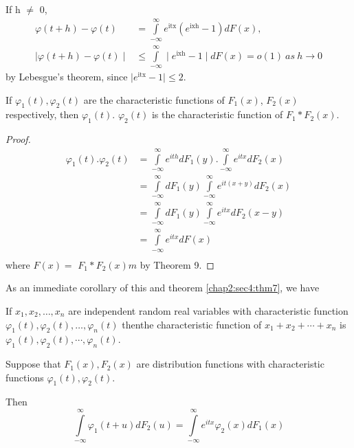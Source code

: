 If  h $\neq$ 0,
\begin{align*} 
  \varphi(t+h) - \varphi(t) & = \int\limits^\infty_{-\infty}
  e^{\text{itx}} (e^{\text{ixh}}-1)
  dF(x),\\ 
  \mid \varphi(t+h) - \varphi(t)\mid & \leq \int\limits^\infty_{-\infty} \mid
  e^{\text{ixh}}-1 \mid dF(x)=o (1)~as~h \rightarrow 0 
\end{align*}
by Lebesgue's theorem, since $ \mid e^{\text{itx}} -1 \mid \leq 2$. 

\begin{theorem}\label{chap2:sec5:thm11}%
  If $ \varphi_1(t), \varphi_2(t)$ are the characteristic functions of
  $F_1 (x)$, $F_2 (x)$ respectively,  then $ \varphi_1(t)$. $\varphi_2(t)$
  is the characteristic function of $F_1 * F_2 (x)$. 
\end{theorem}

\begin{proof}
  \begin{align*}
    \varphi_1(t). \varphi_2(t) &= \int\limits_{- \infty}^{\infty}
    e^{ith} dF_1(y). \int\limits^\infty_{-\infty} e^{itx} dF_2(x)\\ 
    & = \int\limits^\infty_{-\infty} dF_1 (y)
    \int\limits^\infty_{-\infty}e^{it(x+y)} dF_2(x) \\ 
    & = \int\limits^\infty_{-\infty} dF_1 (y)
    \int\limits^\infty_{-\infty}e^{itx} dF_2(x-y) \\ 
    & = \int\limits^\infty_{-\infty}e^{itx} dF(x) \\
  \end{align*}
  where $F(x) = $ $F_1*F_2 (x)m$ by Theorem 9.
\end{proof}

As an immediate corollary of this and theorem \ref{chap2:sec4:thm7}, we have 

\begin{theorem}\label{chap2:sec5:thm12} %
  If $x_1,x_2,\ldots,x_n$ are independent random real variables with
  characteristic function $ \varphi_1(t),\varphi_2(t),\ldots,\varphi_n(t)$ 
  then\pageoriginale the characteristic function of $x_1+x_2+\cdots+x_n$ is
  $\varphi_1(t),\varphi_2(t),\cdots,\varphi_n(t)$. 
\end{theorem}

\begin{theorem}\label{chap2:sec5:thm13}
  Suppose that $F_1(x),F_2(x)$ are distribution functions with
  characteristic functions $\varphi_1(t),\varphi_2(t)$. 
  
  Then
  $$ 
  \int\limits^\infty_{-\infty}\varphi_1(t+u) dF_2(u) =
  \int\limits^\infty_{-\infty}e^{itx} \varphi_2(x)  dF_1(x)
  $$
\end{theorem}


